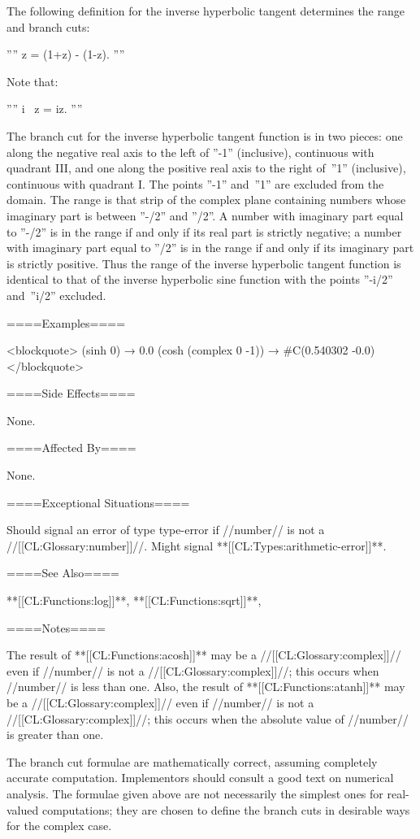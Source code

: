 The following definition for the inverse hyperbolic tangent determines the range and branch cuts:

''''  z = {{ (1+z) -  (1-z)}}. ''''

Note that:

'''' i\  z =  iz. ''''

The branch cut for the inverse hyperbolic tangent function is in two pieces: one along the negative real axis to the left of ''-1'' (inclusive), continuous with quadrant III, and one along the positive real axis to the right of~''1'' (inclusive), continuous with quadrant I. The points ''-1'' and~''1'' are excluded from the domain. The range is that strip of the complex plane containing numbers whose imaginary part is between ''-\pi/2'' and ''\pi/2''. A number with imaginary part equal to ''-\pi/2'' is in the range if and only if its real part is strictly negative; a number with imaginary part equal to ''\pi/2'' is in the range if and only if its imaginary part is strictly positive. Thus the range of the inverse hyperbolic tangent function is identical to that of the inverse hyperbolic sine function with the points ''-\pi i/2'' and~''\pi i/2'' excluded.

====Examples====

<blockquote> (sinh 0) → 0.0 (cosh (complex 0 -1)) → #C(0.540302 -0.0) </blockquote>

====Side Effects====

None.

====Affected By====

None.

====Exceptional Situations====

Should signal an error of type type-error if //number// is not a //[[CL:Glossary:number]]//. Might signal **[[CL:Types:arithmetic-error]]**.

====See Also====

**[[CL:Functions:log]]**, **[[CL:Functions:sqrt]]**, {\secref\FloatSubstitutability}

====Notes====

The result of **[[CL:Functions:acosh]]** may be a //[[CL:Glossary:complex]]// even if //number// is not a //[[CL:Glossary:complex]]//; this occurs when //number// is less than one. Also, the result of **[[CL:Functions:atanh]]** may be a //[[CL:Glossary:complex]]// even if //number// is not a //[[CL:Glossary:complex]]//; this occurs when the absolute value of //number// is greater than one.

The branch cut formulae are mathematically correct, assuming completely accurate computation. Implementors should consult a good text on numerical analysis. The formulae given above are not necessarily the simplest ones for real-valued computations; they are chosen to define the branch cuts in desirable ways for the complex case.

  

